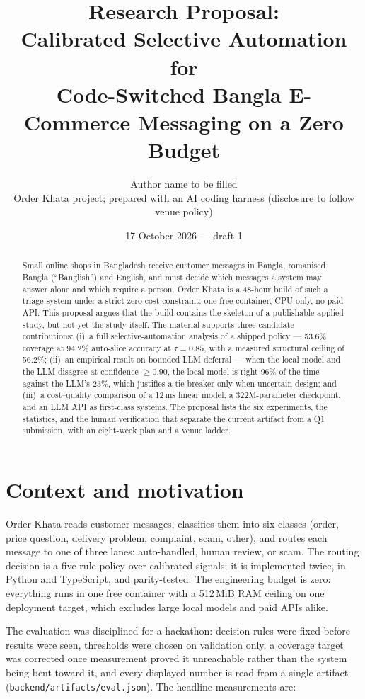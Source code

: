 \documentclass[11pt]{article}
\title{Research Proposal:\\Calibrated Selective Automation for\\Code-Switched Bangla E-Commerce Messaging on a Zero Budget}
\author{Author name to be filled \\ \small Order Khata project; prepared with an AI coding harness (disclosure to follow venue policy)}
\date{17 October 2026 --- draft 1}
\begin{document}
\maketitle

\begin{abstract}
Small online shops in Bangladesh receive customer messages in Bangla, romanised
Bangla (``Banglish'') and English, and must decide which messages a system may
answer alone and which require a person. Order Khata is a 48-hour build of such a
triage system under a strict zero-cost constraint: one free container, CPU only,
no paid API. This proposal argues that the build contains the skeleton of a
publishable applied study, but not yet the study itself. The material supports
three candidate contributions: (i)~a full selective-automation analysis of a
shipped policy --- 53.6\% coverage at 94.2\% auto-slice accuracy at
$\tau=0.85$, with a measured structural ceiling of 56.2\%; (ii)~an empirical
result on bounded LLM deferral --- when the local model and the LLM disagree at
confidence $\geq 0.90$, the local model is right 96\% of the time against the
LLM's 23\%, which justifies a tie-breaker-only-when-uncertain design; and
(iii)~a cost--quality comparison of a 12\,ms linear model, a 322M-parameter
checkpoint, and an LLM API as first-class systems. The proposal lists the six
experiments, the statistics, and the human verification that separate the
current artifact from a Q1 submission, with an eight-week plan and a venue
ladder.
\end{abstract}

\section{Context and motivation}
Order Khata reads customer messages, classifies them into six classes
(order, price question, delivery problem, complaint, scam, other), and routes
each message to
one of three lanes: auto-handled, human review, or scam. The routing decision
is a five-rule policy over calibrated signals; it is implemented twice, in
Python and TypeScript, and parity-tested. The engineering budget is zero:
everything runs in one free container with a 512\,MiB RAM ceiling on one
deployment target, which excludes large local models and paid APIs alike.

The evaluation was disciplined for a hackathon: decision rules were fixed
before results were seen, thresholds were chosen on validation only, a coverage
target was corrected once measurement proved it unreachable rather than the
system being bent toward it, and every displayed number is read from a single
artifact (\texttt{backend/artifacts/eval.json}). The headline measurements are:
\end{document}
